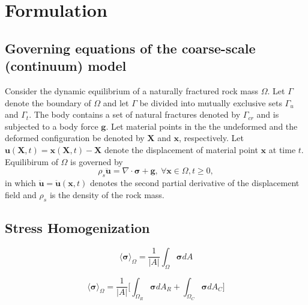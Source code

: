 \section{Formulation}

\subsection{Governing equations of the coarse-scale (continuum) model}
Consider the dynamic equilibrium of a naturally fractured rock mass $\Omega$. Let $\Gamma$ denote the boundary of $\Omega$ and let $\Gamma$ be divided into mutually exclusive sets $\Gamma_u$ and $\Gamma_t$.   The body contains a set of natural fractures denoted by $\Gamma_{cr}$ and is subjected to a body force $\mathbf{g}$.  Let material points in the the undeformed and the deformed configuration be denoted by $\mathbf{X}$ and $\mathbf{x}$, respectively. Let $\mathbf{u}\left(\mathbf{X}, t\right)=\mathbf{x}\left(\mathbf{X}, t\right)-\mathbf{X}$ denote the displacement of material point $\mathbf{x}$ at time $t$.    Equilibirum of $\Omega$ is governed by
\begin{equation}
\label{eqn:equil}
\rho_s \ddot{\mathbf{u}} =\nabla \cdot \boldsymbol{\sigma} +\mathbf{g},\:\forall \mathbf{x}\in\Omega, t\geq0,
\end{equation}
in which $\ddot{\mathbf{u}}=\ddot{\mathbf{u}}\left(\mathbf{x}, t\right)$ denotes the second partial derivative of the displacement field and $\rho_s$ is the density of the rock mass. 

\subsection{Stress Homogenization}

\begin{equation}
\label{eqn:stressav}
\langle \boldsymbol{\sigma} \rangle_\Omega = \frac{1}{\vert A \vert} \int_\Omega \boldsymbol{\sigma} { dA}
\end{equation}

\begin{equation}
\label{eqn:stresssplit}
\langle \boldsymbol{\sigma} \rangle_\Omega = \frac{1}{\vert A \vert} \bigg \lbrack {\int_{\Omega_{R}} \boldsymbol{\sigma} { dA_R} + \int_{\Omega_{C}} \boldsymbol{\sigma} { dA_C}} \bigg \rbrack
\end{equation}

